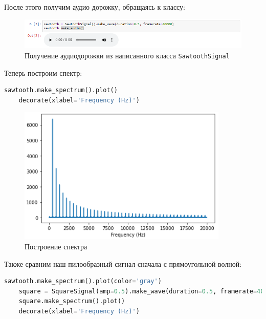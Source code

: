 \documentclass[a4paper]{article}
\begin{document}
            После этого получим аудио дорожку, обращаясь к классу:
            
            \begin{figure}[H]
                \centering
                \includegraphics[width=\textwidth]{ex_2_class_audio.png}
                \caption{Получение аудиодорожки из написанного класса \texttt{SawtoothSignal}}
                \label{fig:class_audio}
            \end{figure}
            
            Теперь построим спектр:
            
\begin{lstlisting}[language=Python, caption= Построение спектра]
    sawtooth.make_spectrum().plot()
    decorate(xlabel='Frequency (Hz)')
\end{lstlisting}               
            
            \begin{figure}[H]
                \centering
                \includegraphics[width=\textwidth]{ex_2_class_spectr_1.png}
                \caption{Построение спектра}
                \label{fig:class_spectr_1}
            \end{figure}
            
            Также сравним наш пилообразный сигнал сначала с прямоугольной волной:
            
\begin{lstlisting}[language=Python, caption= Построение прямоугольной волны]
    sawtooth.make_spectrum().plot(color='gray')
    square = SquareSignal(amp=0.5).make_wave(duration=0.5, framerate=40000)
    square.make_spectrum().plot()
    decorate(xlabel='Frequency (Hz)')
\end{lstlisting}               
            
\end{document}
